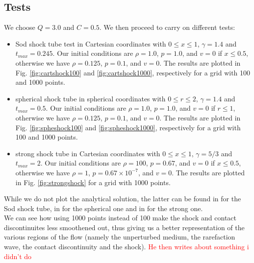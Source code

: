 \documentclass{article}
\begin{document}
\subsection{Tests}
We choose $Q=3.0$ and $C=0.5$. We then proceed to carry on different tests:
\begin{itemize}
	\item Sod shock tube test in Cartesian coordinates with $0\le x \le 1$, $\gamma=1.4$ and $t_{max}=0.245$. Our initial conditions are $\rho=1.0$, $p=1.0$, and $v=0$ if $x\le 0.5$, otherwise we have $\rho=0.125$, $p=0.1$, and $v=0$. The results are plotted in Fig. \ref{fig:cartshock100} and \ref{fig:cartshock1000}, respectively for a grid with 100 and 1000 points.
	\item spherical shock tube in spherical coordinates with $0\le r \le 2$, $\gamma=1.4$ and $t_{max}=0.5$. Our initial conditions are $\rho=1.0$, $p=1.0$, and $v=0$ if $r\le 1$, otherwise we have $\rho=0.125$, $p=0.1$, and $v=0$. The results are plotted in Fig. \ref{fig:spheshock100} and \ref{fig:spheshock1000}, respectively for a grid with 100 and 1000 points.
	\item strong shock tube in Cartesian coordinates with $0\le x \le 1$, $\gamma=5/3$ and $t_{max}=2$. Our initial conditions are $\rho=100$, $p=0.67$, and $v=0$ if $x\le 0.5$, otherwise we have $\rho=1$, $p=0.67\times 10^{-7}$, and $v=0$. The results are plotted in Fig. \ref{fig:strongshock} for a grid with 1000 points.
\end{itemize}
While we do not plot the analytical solution, the latter can be found in \cite{stone} for the Sod shock tube, in \cite{omang} for the spherical one and in \cite{hawley} for the strong one. \\
We can see how using 1000 points instead of 100 make the shock and contact discontinuites less smoothened out, thus giving us a better representation of the various regions of the flow (namely the unperturbed medium, the rarefaction wave, the contact discontinuity and the shock).
\textcolor{red}{He then writes about something i didn't do}
\end{document}
